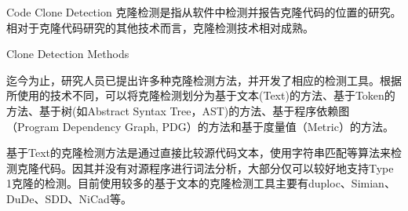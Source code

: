 
{Code Clone Detection }
\label{clonedetection}
克隆检测是指从软件中检测并报告克隆代码的位置的研究。相对于克隆代码研究的其他技术而言，克隆检测技术相对成熟。

{Clone Detection Methods}

迄今为止，研究人员已提出许多种克隆检测方法，并开发了相应的检测工具。根据所使用的技术不同，可以将克隆检测划分为基于文本(Text)的方法、基于Token的方法、基于树(如Abstract Syntax Tree，AST)的方法、基于程序依赖图（Program Dependency Graph, PDG）的方法和基于度量值（Metric）的方法。

基于Text的克隆检测方法是通过直接比较源代码文本，使用字符串匹配等算法来检测克隆代码。因其并没有对源程序进行词法分析，大部分仅可以较好地支持Type 1克隆的检测。目前使用较多的基于文本的克隆检测工具主要有duploc\cite{ducasse1999language}、Simian\cite{Simian}、DuDe\cite{wettel2005archeology}、SDD\cite{lee2005sdd}、NiCad\cite{roy2008nicad}等。

